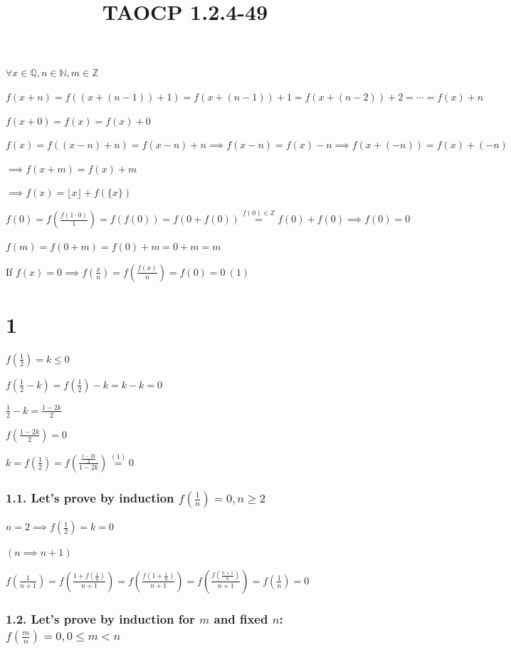 \documentclass{article}
\title{TAOCP 1.2.4\mbox{-}49}
\begin{document}
\maketitle

\( \forall x \in \mathbb{Q}, n \in \mathbb{N}, m \in \mathbb{Z} \)

\( f(x+n) = f((x+(n-1))+1) = f(x+(n-1)) + 1 = f(x+(n-2)) + 2 = \cdots = f(x) + n \)

\( f(x+0) = f(x) = f(x) + 0 \)

\( f(x) = f((x-n)+n) = f(x-n) + n \implies f(x-n) = f(x) - n \implies f(x+(-n)) = f(x) + (-n) \)

\( \implies f(x+m) = f(x) + m \)

\( \implies f(x) = \lfloor{x}\rfloor + f(\{ x \}) \)

\( f(0) = f(\frac{f(1 \cdot 0)}{1}) = f(f(0)) = f(0 + f(0)) \overset{f(0) \in \mathbb{Z}}{=} f(0) + f(0) \implies f(0) = 0 \)

\( f(m) = f(0+m) = f(0) + m = 0 + m = m \)

If \( f(x) = 0 \implies f(\frac{x}{n}) = f(\frac{f(x)}{n}) = f(0) = 0\ (1) \)

\section*{1}

\( f(\frac{1}{2}) = k \leq 0 \)

\( f(\frac{1}{2}-k) = f(\frac{1}{2}) - k = k - k = 0 \)

\( \frac{1}{2} - k = \frac{1-2k}{2} \)

\( f(\frac{1-2k}{2}) = 0 \)

\( k = f(\frac{1}{2}) = f(\frac{\frac{1-2k}{2}}{1-2k}) \overset{(1)}{=} 0 \)

\subsubsection*{1.1. Let's prove by induction \( f(\frac{1}{n}) = 0, n \geq 2 \)}

\( n = 2 \implies f(\frac{1}{2}) = k = 0 \)

\( (n \implies n + 1) \)

\( f(\frac{1}{n+1}) = f(\frac{1+f(\frac{1}{n})}{n+1}) = f(\frac{f(1+\frac{1}{n})}{n+1}) = f(\frac{f(\frac{n+1}{n})}{n+1}) = f(\frac{1}{n}) = 0 \)

\subsubsection*{1.2. Let's prove by induction for \( m \) and fixed \( n \): \( f(\frac{m}{n}) = 0, 0 \leq m < n \)}
\end{document}

